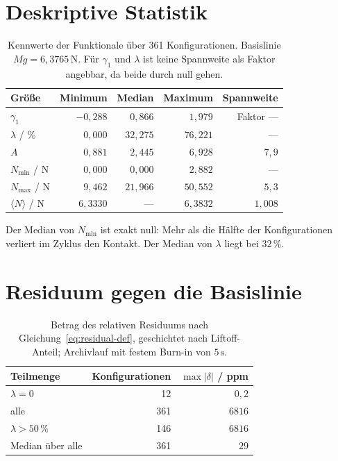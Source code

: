 \documentclass[12pt,a4paper]{report}
\begin{document}
\section{Deskriptive Statistik}

\begin{table}[htbp]
  \centering
  \begin{tabular}{lrrrr}
    \hline
    Größe & Minimum & Median & Maximum & Spannweite \\
    \hline
    $\gamma_1$ & $-0{,}288$ & $0{,}866$ & $1{,}979$ & Faktor --- \\
    $\lambda$ / \% & $0{,}000$ & $32{,}275$ & $76{,}221$ & --- \\
    $A$ & $0{,}881$ & $2{,}445$ & $6{,}928$ & $7{,}9$ \\
    $N_{\min}$ / N & $0{,}000$ & $0{,}000$ & $2{,}882$ & --- \\
    $N_{\max}$ / N & $9{,}462$ & $21{,}966$ & $50{,}552$ & $5{,}3$ \\
    $\langle N \rangle$ / N & $6{,}3330$ & --- & $6{,}3832$ & $1{,}008$ \\
    \hline
  \end{tabular}
  \caption{Kennwerte der Funktionale über 361 Konfigurationen.
  Basislinie $Mg = 6{,}3765\,\mathrm{N}$. Für $\gamma_1$ und $\lambda$
  ist keine Spannweite als Faktor angebbar, da beide durch null gehen.}
  \label{tab:deskriptiv}
\end{table}

Der Median von $N_{\min}$ ist exakt null: Mehr als die Hälfte der
Konfigurationen verliert im Zyklus den Kontakt. Der Median von
$\lambda$ liegt bei $32\,\%$.

\section{Residuum gegen die Basislinie}
\label{sec:anh-residuum}

\begin{table}[htbp]
  \centering
  \begin{tabular}{lrr}
    \hline
    Teilmenge & Konfigurationen & $\max |\delta|$ / ppm \\
    \hline
    $\lambda = 0$                & 12  & $0{,}2$ \\
    alle                         & 361 & $6816$ \\
    $\lambda > 50\,\%$           & 146 & $6816$ \\
    \hline
    Median über alle             & 361 & $29$ \\
    \hline
  \end{tabular}
  \caption{Betrag des relativen Residuums nach
  Gleichung~\eqref{eq:residual-def}, geschichtet nach Liftoff-Anteil;
  Archivlauf mit festem Burn-in von $5\,\mathrm{s}$.}
  \label{tab:residuum-anhang}
\end{table}
\end{document}
